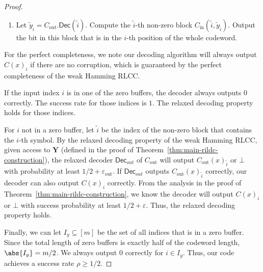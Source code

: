 \documentclass[10pt,a4paper]{article}
\theoremstyle{remark}
\newcommand{\eps}{\ensuremath{\varepsilon}}
\newcommand{\Dec}{\ensuremath{\mathsf{Dec}}\xspace}
\newcommand{\tildey}{\ensuremath{\widetilde{y}}\xspace}
\newcommand{\Cout}{C_{\text{out}}}
\newcommand{\epsout}{\eps_{\text{out}}}
\newcommand{\Cin}{C_{\text{in}}}
\begin{document}
\begin{proof}
\begin{enumerate}
\begin{enumerate}
		\item Answer $\Cout.\Dec(i)$ with bit $\tildey_j$ and await the next query.
	\end{enumerate}
	
	\item Let $\tilde{y}_{\tilde{i}} = \Cout.\Dec(\tilde{i})$. Compute the $\tilde{i}$-th non-zero block $\Cin(\tilde{i}, \tilde{y}_{\tilde{i}})$. Output the bit in this block that is in the $i$-th position of the whole codeword. 
\end{enumerate}

For the perfect completeness, we note our decoding algorithm will always output $C(x)_i$ if there are no corruption, which is guaranteed by the perfect completeness of the weak Hamming RLCC. 


If the input index $i$ is in one of the zero buffers, the decoder always outputs $0$ correctly. The success rate for those indices is $1$. The relaxed decoding property holds for those indices. 

For $i$ not in a zero buffer, let $\tilde{i}$ be the index of the non-zero block that contains the $i$-th symbol. By the relaxed decoding property of the weak Hamming RLCC, given access to $\mathbf{Y}$ (defined in the proof of Theorem~\ref{thm:main-rildc-construction}), the relaxed decoder $\Dec_{out}$ of $\Cout$ will output $\Cout(x)_{\tilde{i}}$ or $\bot$ with probability at least $1/2+\epsout$. If $\Dec_{out}$ outputs $\Cout(x)_{\tilde{i}}$ correctly, our decoder can also output $C(x)_i$ correctly. From the analysis in the proof of Theorem~\ref{thm:main-rildc-construction}, we know the decoder will output $C(x)_i$ or $\bot$ with success probability at least $1/2 + \eps$. Thus, the relaxed decoding property holds.



Finally, we can let $I_y \subseteq [m]$ be the set of all indices that is in a zero buffer. Since the total length of zero buffers is exactly half of the codeword length, $\abs{I_y} = m/2$. We always output 0 correctly for $i\in I_y$. Thus, our code achieves a success rate $\rho \ge 1/2$.
\end{proof}
\end{document}
